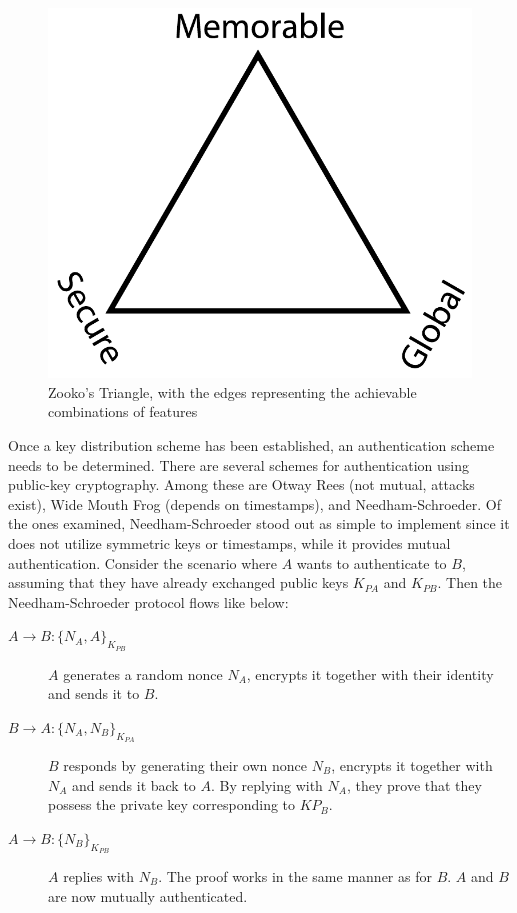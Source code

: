 \begin{figure}[ht]
\centering
\includegraphics[width=\textwidth,height=0.2\paperheight,keepaspectratio
]{figures/Zooko_s_Triangle}
\caption{Zooko's Triangle, with the edges representing the achievable combinations of features \cite{WikiMedia:2006}}
\label{fig:zooko}
\end{figure}

Once a key distribution scheme has been established, an authentication scheme needs to be determined. There are several schemes for authentication using public-key cryptography. Among these are Otway Rees (not mutual, attacks exist\cite{Wang:2000}), Wide Mouth Frog\cite{Burrows:1990} (depends on timestamps), and Needham-Schroeder\cite{Needham:1978}. Of the ones examined, Needham-Schroeder stood out as simple to implement since it does not utilize symmetric keys or timestamps, while it provides mutual authentication. Consider the scenario where $A$ wants to authenticate to $B$, assuming that they have already exchanged public keys $K_{PA}$ and $K_{PB}$. Then the Needham-Schroeder protocol flows like below:

\begin{description}
  \item[$A \rightarrow B: \{N_A, A\}_{K_{PB}}$] $A$ generates a random nonce $N_A$, encrypts it together with their identity and sends it to $B$.
  \item[$B \rightarrow A: \{N_A, N_B\}_{K_{PA}}$] $B$ responds by generating their own nonce $N_B$, encrypts it together with $N_A$ and sends it back to $A$. By replying with $N_A$, they prove that they possess the private key corresponding to $KP_B$.
  \item[$A \rightarrow B: \{N_B\}_{K_{PB}}$] $A$ replies with $N_B$. The proof works in the same manner as for $B$. $A$ and $B$ are now mutually authenticated.
\end{description}

